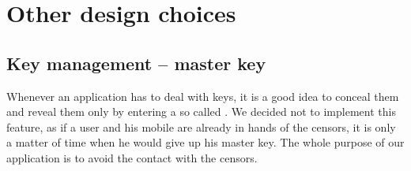 \section{Other design choices}

\subsection{Key management -- master key}
Whenever an application has to deal with keys, it is a good idea to conceal them
and reveal them only by entering a so called . We decided not to implement
this feature, as if a user and his mobile are already in hands of the censors, it is only 
a matter of time when he would give up his master key. The whole purpose of our application
is to avoid the contact with the censors.
